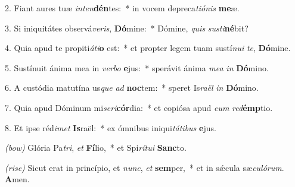 2. Fiant aures tuæ \textit{in}\textit{ten}\textbf{dén}tes:~* in vocem depreca\textit{ti}\textit{ó}\textit{nis} \textbf{me}æ.

3. Si iniquitátes observá\textit{ve}\textit{ris}, \textbf{Dó}mine:~* Dómine, \textit{quis} \textit{sus}\textit{ti}\textbf{né}bit?

4. Quia apud te propiti\textit{á}\textit{ti}\textbf{o} est:~* et propter legem tuam sustí\textit{nu}\textit{i} \textit{te}, \textbf{Dó}mine.

5. Sustínuit ánima mea in \textit{ver}\textit{bo} \textbf{e}jus:~* sperávit ánima \textit{me}\textit{a} \textit{in} \textbf{Dó}mino.

6. A custódia matutína us\textit{que} \textit{ad} \textbf{noc}tem:~* speret Is\textit{ra}\textit{ël} \textit{in} \textbf{Dó}mino.

7. Quia apud Dóminum mi\textit{se}\textit{ri}\textbf{cór}dia:~* et copiósa apud \textit{e}\textit{um} \textit{red}\textbf{émp}tio.

8. Et ipse réd\textit{i}\textit{met} \textbf{Is}raël:~* ex ómnibus iniqui\textit{tá}\textit{ti}\textit{bus} \textbf{e}jus.

{\color{red}\textit{(bow)}} Glória Pa\textit{tri}, \textit{et} \textbf{Fí}lio,~* et Spi\textit{rí}\textit{tu}\textit{i} \textbf{Sanc}to.

{\color{red}\textit{(rise)}} Sicut erat in princípio, et \textit{nunc}, \textit{et} \textbf{sem}per,~* et in s\'{\ae}cula sæ\textit{cu}\textit{ló}\textit{rum}. \textbf{A}men.
